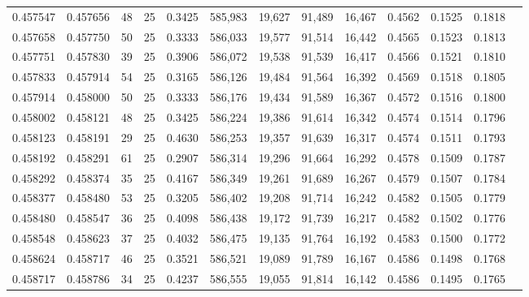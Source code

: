 \begin{tabular}{rrrrrrrrrrrrr}
0.457547 & 0.457656 &    48 &  25 &                                     0.3425 & 585,983 &  19,627 &  91,489 &  16,467 & 0.4562 & 0.1525 & 0.1818 \\
0.457658 & 0.457750 &    50 &  25 &                                     0.3333 & 586,033 &  19,577 &  91,514 &  16,442 & 0.4565 & 0.1523 & 0.1813 \\
0.457751 & 0.457830 &    39 &  25 &                                     0.3906 & 586,072 &  19,538 &  91,539 &  16,417 & 0.4566 & 0.1521 & 0.1810 \\
0.457833 & 0.457914 &    54 &  25 &                                     0.3165 & 586,126 &  19,484 &  91,564 &  16,392 & 0.4569 & 0.1518 & 0.1805 \\
0.457914 & 0.458000 &    50 &  25 &                                     0.3333 & 586,176 &  19,434 &  91,589 &  16,367 & 0.4572 & 0.1516 & 0.1800 \\
0.458002 & 0.458121 &    48 &  25 &                                     0.3425 & 586,224 &  19,386 &  91,614 &  16,342 & 0.4574 & 0.1514 & 0.1796 \\
0.458123 & 0.458191 &    29 &  25 &                                     0.4630 & 586,253 &  19,357 &  91,639 &  16,317 & 0.4574 & 0.1511 & 0.1793 \\
0.458192 & 0.458291 &    61 &  25 &                                     0.2907 & 586,314 &  19,296 &  91,664 &  16,292 & 0.4578 & 0.1509 & 0.1787 \\
0.458292 & 0.458374 &    35 &  25 &                                     0.4167 & 586,349 &  19,261 &  91,689 &  16,267 & 0.4579 & 0.1507 & 0.1784 \\
0.458377 & 0.458480 &    53 &  25 &                                     0.3205 & 586,402 &  19,208 &  91,714 &  16,242 & 0.4582 & 0.1505 & 0.1779 \\
0.458480 & 0.458547 &    36 &  25 &                                     0.4098 & 586,438 &  19,172 &  91,739 &  16,217 & 0.4582 & 0.1502 & 0.1776 \\
0.458548 & 0.458623 &    37 &  25 &                                     0.4032 & 586,475 &  19,135 &  91,764 &  16,192 & 0.4583 & 0.1500 & 0.1772 \\
0.458624 & 0.458717 &    46 &  25 &                                     0.3521 & 586,521 &  19,089 &  91,789 &  16,167 & 0.4586 & 0.1498 & 0.1768 \\
0.458717 & 0.458786 &    34 &  25 &                                     0.4237 & 586,555 &  19,055 &  91,814 &  16,142 & 0.4586 & 0.1495 & 0.1765 \\

\end{tabular}
